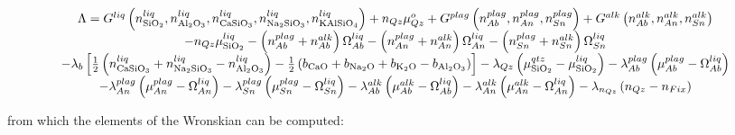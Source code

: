 \documentclass[11pt, titlepage, twoside]{article}
\begin{document}
\begin{MPEquation}[!ht]
\begin{equation}
\begin{array}{c}
\Lambda  = {G^{liq}}\left( {n_{{\rm{Si}}{{\rm{O}}_2}}^{liq},n_{{\rm{A}}{{\rm{l}}_2}{{\rm{O}}_3}}^{liq},n_{{\rm{CaSi}}{{\rm{O}}_3}}^{liq},n_{{\rm{N}}{{\rm{a}}_{\rm{2}}}{\rm{Si}}{{\rm{O}}_3}}^{liq},n_{{\rm{KAlSi}}{{\rm{O}}_4}}^{liq}} \right) + {n_{Qz}}\mu _{Qz}^o + {G^{plag}}\left( {n_{Ab}^{plag},n_{An}^{plag},n_{Sn}^{plag}} \right) + {G^{alk}}\left( {n_{Ab}^{alk},n_{An}^{alk},n_{Sn}^{alk}} \right)\\
 - {n_{Qz}}\mu _{{\rm{Si}}{{\rm{O}}_2}}^{liq} - \left( {n_{Ab}^{plag} + n_{Ab}^{alk}} \right)\Omega _{Ab}^{liq} - \left( {n_{An}^{plag} + n_{An}^{alk}} \right)\Omega _{An}^{liq} - \left( {n_{Sn}^{plag} + n_{Sn}^{alk}} \right)\Omega _{Sn}^{liq}\\
 - {\lambda _b}\left[ {\frac{1}{2}\left( {n_{{\rm{CaSi}}{{\rm{O}}_3}}^{liq} + n_{{\rm{N}}{{\rm{a}}_2}{\rm{Si}}{{\rm{O}}_3}}^{liq} - n_{{\rm{A}}{{\rm{l}}_2}{{\rm{O}}_3}}^{liq}} \right) - \frac{1}{2}\left( {{b_{{\rm{CaO}}}} + {b_{{\rm{N}}{{\rm{a}}_2}{\rm{O}}}} + {b_{{{\rm{K}}_2}{\rm{O}}}} - {b_{{\rm{A}}{{\rm{l}}_2}{{\rm{O}}_3}}}} \right)} \right] - {\lambda _{Qz}}\left( {\mu _{{\rm{Si}}{{\rm{O}}_2}}^{qtz} - \mu _{{\rm{Si}}{{\rm{O}}_2}}^{liq}} \right) - \lambda _{Ab}^{plag}\left( {\mu _{Ab}^{plag} - \Omega _{Ab}^{liq}} \right)\\
 - \lambda _{An}^{plag}\left( {\mu _{An}^{plag} - \Omega _{An}^{liq}} \right) - \lambda _{Sn}^{plag}\left( {\mu _{Sn}^{plag} - \Omega _{Sn}^{liq}} \right) - \lambda _{Ab}^{alk}\left( {\mu _{Ab}^{alk} - \Omega _{Ab}^{liq}} \right) - \lambda _{An}^{alk}\left( {\mu _{An}^{alk} - \Omega _{An}^{liq}} \right) - {\lambda _{{n_{Qz}}}}\left( {{n_{Qz}} - {n_{Fix}}} \right)
\end{array}
\end{equation}
\label{MPEquationElement:A42C8045-0353-4ABD-BAC5-B5AE3B79EC52}
\end{MPEquation}
from which the elements of the Wronskian can be computed:
\end{document}
